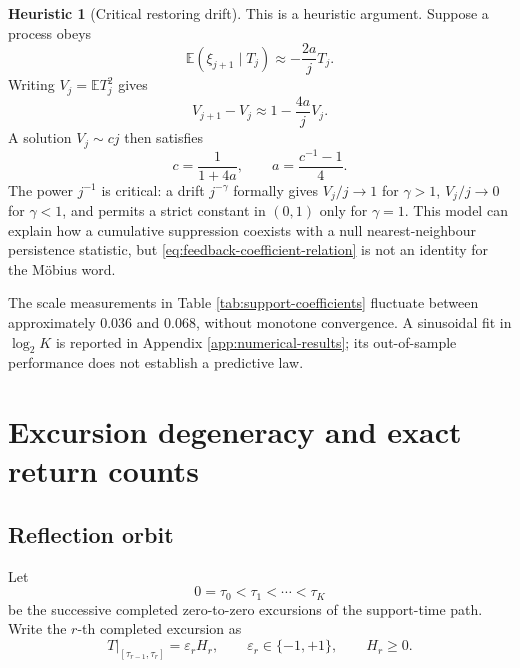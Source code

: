 \documentclass[11pt,reqno]{amsart}
\numberwithin{equation}{section}
\theoremstyle{plain}
\theoremstyle{definition}
\newtheorem{heuristic}[theorem]{Heuristic}
\theoremstyle{remark}
\newcommand{\E}{\mathbb E}
\begin{document}
\begin{heuristic}[Critical restoring drift]
\label{heur:critical-restoring-drift}
This is a heuristic argument.  Suppose a process obeys
\begin{equation}
\E(\xi_{j+1}\mid T_j)\approx-\frac{2a}{j}T_j.
\label{eq:critical-restoring-drift}
\end{equation}
Writing \(V_j=\E T_j^2\) gives
\begin{equation}
V_{j+1}-V_j\approx1-\frac{4a}{j}V_j.
\label{eq:variance-feedback-recursion}
\end{equation}
A solution \(V_j\sim cj\) then satisfies
\begin{equation}
c=\frac{1}{1+4a},\qquad a=\frac{c^{-1}-1}{4}.
\label{eq:feedback-coefficient-relation}
\end{equation}
The power \(j^{-1}\) is critical: a drift \(j^{-\gamma}\) formally gives
\(V_j/j\to1\) for \(\gamma>1\), \(V_j/j\to0\) for \(\gamma<1\), and permits a
strict constant in \((0,1)\) only for \(\gamma=1\).  This model can explain
how a cumulative suppression coexists with a null nearest-neighbour
persistence statistic, but \eqref{eq:feedback-coefficient-relation} is not an
identity for the M\"obius word.
\end{heuristic}

The scale measurements in Table \ref{tab:support-coefficients} fluctuate
between approximately \(0.036\) and \(0.068\), without monotone convergence.
A sinusoidal fit in \(\log_2K\) is reported in Appendix
\ref{app:numerical-results}; its out-of-sample performance does not establish
a predictive law.

\section{Excursion degeneracy and exact return counts}
\label{sec:excursion-geometry}

\subsection{Reflection orbit}
\label{subsec:reflection-orbit}

Let
\begin{equation}
0=\tau_0<\tau_1<\cdots<\tau_K
\label{eq:completed-return-times}
\end{equation}
be the successive completed zero-to-zero excursions of the support-time path.
Write the \(r\)-th completed excursion as
\begin{equation}
T|_{[\tau_{r-1},\tau_r]}=\varepsilon_rH_r,\qquad
\varepsilon_r\in\{-1,+1\},\qquad H_r\geq0.
\label{eq:excursion-decomposition}
\end{equation}
\end{document}
